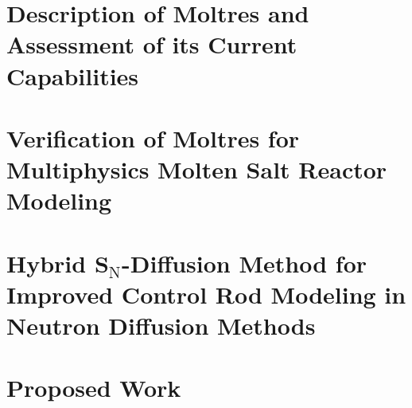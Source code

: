 \documentclass[edeposit,fullpage,11pt]{uiucthesis2021}
\begin{document}
\chapter{Description of Moltres and Assessment of its Current Capabilities}
\label{chap:moltres}

\glsresetall

\chapter{Verification of Moltres for Multiphysics Molten Salt
Reactor Modeling}
\label{chap:benchmark}

\glsresetall

\chapter{Hybrid S$_\text{N}$-Diffusion Method for Improved Control Rod Modeling
in Neutron Diffusion Methods}
\label{chap:hybrid}

\glsresetall

\chapter{Proposed Work}
\label{chap:proposedwork}
%
\glsresetall

\backmatter



\end{document}
